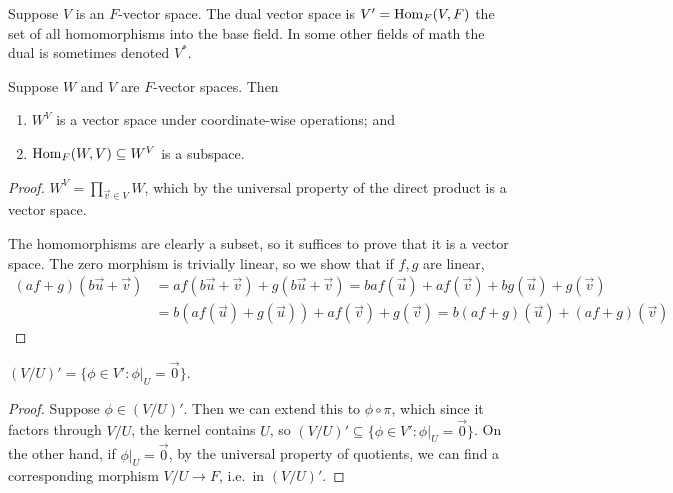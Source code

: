 \begin{definition}
    Suppose \(V\) is an \(F\)-vector space.
    The dual vector space is \(V' = \operatorname{Hom}_F(V,F)\)
    the set of all homomorphisms into the base field.
    In some other fields of math the dual is sometimes denoted \(V^\ast\).
\end{definition}
\begin{lemma}
    Suppose \(W\) and \(V\) are \(F\)-vector spaces. Then
    \begin{enumerate}[label={(\alph*)}, itemsep=0mm]
        \item \(W^V\) is a vector space under coordinate-wise operations; and
        \item \(\operatorname{Hom}_F(W,V) \subseteq W^V\) is a subspace.
    \end{enumerate}
\end{lemma}
\begin{proof}
    \(W^V = \prod_{\vec{v} \in V} W\),
    which by the universal property of the direct product is a vector space.

    The homomorphisms are clearly a subset,
    so it suffices to prove that it is a vector space.
    The zero morphism is trivially linear,
    so we show that if \(f,g\) are linear,
    \begin{align*}
        (af+g)(b\vec{u}+\vec{v}) &= af(b\vec{u}+\vec{v}) + g(b\vec{u}+\vec{v})
        = baf(\vec{u}) + af(\vec{v}) + bg(\vec{u}) + g(\vec{v}) \\
        &= b(af(\vec{u}) + g(\vec{u})) + af(\vec{v}) + g(\vec{v})
        = b(af+g)(\vec{u}) + (af+g)(\vec{v})
    \end{align*}
\end{proof}
\begin{proposition}
    \({(V/U)}' = \{\phi \in V' : \phi\vert_U = \vec{0}\}\).
\end{proposition}
\begin{proof}
    Suppose \(\phi \in {(V/U)}'\).
    Then we can extend this to \(\phi\circ\pi\),
    which since it factors through \(V/U\),
    the kernel contains \(U\),
    so \({(V/U)}' \subseteq \{\phi \in V' : \phi\vert_U = \vec{0}\}\).
    On the other hand, if \(\phi\vert_U = \vec{0}\),
    by the universal property of quotients,
    we can find a corresponding morphism \(V/U \to F\),
    i.e.\ in \({(V/U)}'\).
\end{proof}

